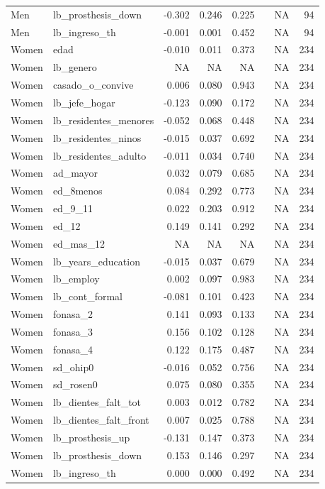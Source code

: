 \begin{table}
\begin{tabular}[t]{llrrrlrr}
Men & lb\_prosthesis\_down & -0.302 & 0.246 & 0.225 &  & NA & 94\\
Men & lb\_ingreso\_th & -0.001 & 0.001 & 0.452 &  & NA & 94\\
\addlinespace
Women & edad & -0.010 & 0.011 & 0.373 &  & NA & 234\\
Women & lb\_genero & NA & NA & NA &  & NA & 234\\
Women & casado\_o\_convive & 0.006 & 0.080 & 0.943 &  & NA & 234\\
Women & lb\_jefe\_hogar & -0.123 & 0.090 & 0.172 &  & NA & 234\\
Women & lb\_residentes\_menores & -0.052 & 0.068 & 0.448 &  & NA & 234\\
\addlinespace
Women & lb\_residentes\_ninos & -0.015 & 0.037 & 0.692 &  & NA & 234\\
Women & lb\_residentes\_adulto & -0.011 & 0.034 & 0.740 &  & NA & 234\\
Women & ad\_mayor & 0.032 & 0.079 & 0.685 &  & NA & 234\\
Women & ed\_8menos & 0.084 & 0.292 & 0.773 &  & NA & 234\\
Women & ed\_9\_11 & 0.022 & 0.203 & 0.912 &  & NA & 234\\
\addlinespace
Women & ed\_12 & 0.149 & 0.141 & 0.292 &  & NA & 234\\
Women & ed\_mas\_12 & NA & NA & NA &  & NA & 234\\
Women & lb\_years\_education & -0.015 & 0.037 & 0.679 &  & NA & 234\\
Women & lb\_employ & 0.002 & 0.097 & 0.983 &  & NA & 234\\
Women & lb\_cont\_formal & -0.081 & 0.101 & 0.423 &  & NA & 234\\
\addlinespace
Women & fonasa\_2 & 0.141 & 0.093 & 0.133 &  & NA & 234\\
Women & fonasa\_3 & 0.156 & 0.102 & 0.128 &  & NA & 234\\
Women & fonasa\_4 & 0.122 & 0.175 & 0.487 &  & NA & 234\\
Women & sd\_ohip0 & -0.016 & 0.052 & 0.756 &  & NA & 234\\
Women & sd\_rosen0 & 0.075 & 0.080 & 0.355 &  & NA & 234\\
\addlinespace
Women & lb\_dientes\_falt\_tot & 0.003 & 0.012 & 0.782 &  & NA & 234\\
Women & lb\_dientes\_falt\_front & 0.007 & 0.025 & 0.788 &  & NA & 234\\
Women & lb\_prosthesis\_up & -0.131 & 0.147 & 0.373 &  & NA & 234\\
Women & lb\_prosthesis\_down & 0.153 & 0.146 & 0.297 &  & NA & 234\\
Women & lb\_ingreso\_th & 0.000 & 0.000 & 0.492 &  & NA & 234\\
\bottomrule
\end{tabular}
\end{table}
